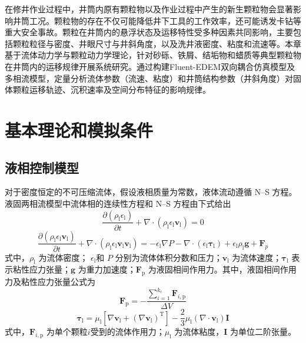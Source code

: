 
\label{keliyunyi}
在修井作业过程中，井筒内原有颗粒物以及作业过程中产生的新生颗粒物会显著影响井筒工况。颗粒物的存在不仅可能降低井下工具的工作效率，还可能诱发卡钻等重大安全事故。颗粒在井筒内的悬浮状态及运移特性受多种因素共同影响，主要包括颗粒粒径与密度、井眼尺寸与井斜角度，以及洗井液密度、粘度和流速等。本章基于流体动力学与颗粒动力学理论，针对砂砾、铁屑、结垢物和蜡质等典型颗粒物在井筒内的运移规律开展系统研究。通过构建Fluent-EDEM双向耦合仿真模型及多相流模型，定量分析流体参数（流速、粘度）和井筒结构参数（井斜角度）对固体颗粒运移轨迹、沉积速率及空间分布特征的影响规律。

\section{基本理论和模拟条件}  

\subsection{液相控制模型}

对于密度恒定的不可压缩流体，假设液相质量为常数，液体流动遵循 N--S 方程。液固两相流模型中流体相的连续性方程和 N--S 方程由下式给出
\begin{equation}
	\frac{\partial(\rho_{\mathrm{l}}\epsilon_{\mathrm{l}})}{\partial t}
	+\nabla\cdot(\rho_{\mathrm{l}}\epsilon_{\mathrm{l}}\bm{v}_{\mathrm{l}})=0
\end{equation}
\begin{equation}
	\frac{\partial(\rho_{\mathrm{l}}\epsilon_{\mathrm{l}}\bm{v}_{\mathrm{l}})}{\partial t}
	+\nabla\cdot(\rho_{\mathrm{l}}\epsilon_{\mathrm{l}}\bm{v}_{\mathrm{l}}\bm{v}_{\mathrm{l}})
	=-\epsilon_{\mathrm{l}}\nabla P
	-\nabla\cdot(\epsilon_{\mathrm{l}}\bm{\tau}_{\mathrm{l}})
	+\epsilon_{\mathrm{l}}\rho_{\mathrm{l}}\bm{g}+\bm{F}_{p}
\end{equation}
式中，\(\rho_{\mathrm{l}}\) 为流体密度； \(\epsilon_{\mathrm{l}}\)和 \(P\) 分别为流体体积分数和压力；\(\bm{v}_{\mathrm{l}}\) 为流体速度；\(\bm{\tau}_{\mathrm{l}}\) 表示粘性应力张量；\(\bm{g}\) 为重力加速度；\(\bm{F}_{\mathrm{p}}\) 为液固相间作用力。其中，液固相间作用力及粘性应力张量公式为
\begin{equation}
	\bm{F}_{\mathrm{p}}
	=-\frac{\sum_{i=1}^{k_{\mathrm{c}}}\bm{F}_{i,\mathrm{p}}}{\Delta V}
\end{equation}
\begin{equation}
	\bm{\tau}_{\mathrm{l}}
	=\mu_{\mathrm{l}}\left[
	\nabla\bm{v}_{\mathrm{l}}
	+\left(\nabla\bm{v}_{\mathrm{l}}\right)^{\mathrm{T}}
	\right]
	-\frac{2}{3}\mu_{\mathrm{l}}
	\left(\nabla\cdot\bm{v}_{\mathrm{l}}\right)\bm{I}
\end{equation}
式中，\(\bm{F}_{i,\mathrm{p}}\) 为单个颗粒\(i\)受到的流体作用力；\(\mu_{\mathrm{l}}\) 为流体粘度，\(\bm{I}\) 为单位二阶张量。

